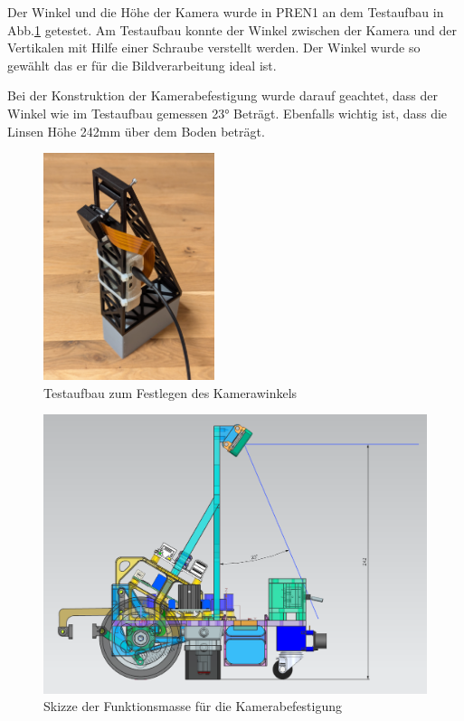 Der Winkel und die Höhe der Kamera wurde in PREN1 an dem Testaufbau in Abb.\ref{fig:Testaufbau zum Festlegen des Kamerawinkels} getestet. Am Testaufbau konnte der Winkel zwischen der Kamera und der Vertikalen mit Hilfe einer Schraube verstellt werden. Der Winkel wurde so gewählt das er für die Bildverarbeitung ideal ist. 

Bei der Konstruktion der Kamerabefestigung wurde darauf geachtet, dass der Winkel wie im Testaufbau gemessen 23° Beträgt. Ebenfalls wichtig ist, dass die Linsen Höhe 242mm  über dem Boden beträgt. 


\begin{figure}[H]
\centering
\includegraphics[width=5cm]{assets/MT/camer_tower_2.png}
\caption{Testaufbau zum Festlegen des Kamerawinkels}
\label{fig:Testaufbau zum Festlegen des Kamerawinkels}
\end{figure}

 \begin{figure}[H]
\centering
\includegraphics[width= \textwidth ]{assets/MT/Sichtfeld_Roboter.png}
\caption{Skizze der Funktionsmasse für die Kamerabefestigung}
\label{fig:Skizze der Funktionsmasse für die Kamerabefestigung}
\end{figure}


